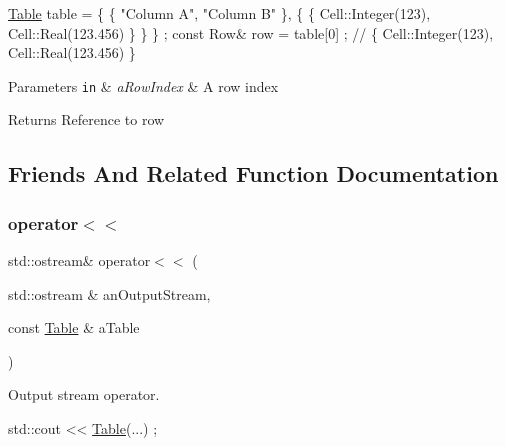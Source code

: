 \begin{DoxyCode}
\hyperlink{classlibrary_1_1core_1_1ctnr_1_1_table_a5b11121caa4288c3da642af7c6a5a632}{Table} table = \{ \{ \textcolor{stringliteral}{"Column A"}, \textcolor{stringliteral}{"Column B"} \}, \{ \{ Cell::Integer(123), Cell::Real(123.456) \} \} \} ;
\textcolor{keyword}{const} Row& row = table[0] ; \textcolor{comment}{// \{ Cell::Integer(123), Cell::Real(123.456) \}}
\end{DoxyCode}



\begin{DoxyParams}[1]{Parameters}
\mbox{\tt in}  & {\em a\+Row\+Index} & A row index \\
\hline
\end{DoxyParams}
\begin{DoxyReturn}{Returns}
Reference to row 
\end{DoxyReturn}


\subsection{Friends And Related Function Documentation}
\mbox{\label{classlibrary_1_1core_1_1ctnr_1_1_table_afaece709b2f143e4011941ae67b7adba}} 
\subsubsection{\texorpdfstring{operator$<$$<$}{operator<<}}
{\footnotesize\ttfamily std\+::ostream\& operator$<$$<$ (\begin{DoxyParamCaption}\item[{std\+::ostream \&}]{an\+Output\+Stream,  }\item[{const \hyperlink{classlibrary_1_1core_1_1ctnr_1_1_table}{Table} \&}]{a\+Table }\end{DoxyParamCaption})\hspace{0.3cm}{\ttfamily [friend]}}



Output stream operator. 


\begin{DoxyCode}
std::cout << \hyperlink{classlibrary_1_1core_1_1ctnr_1_1_table_a5b11121caa4288c3da642af7c6a5a632}{Table}(...) ;
\end{DoxyCode}



